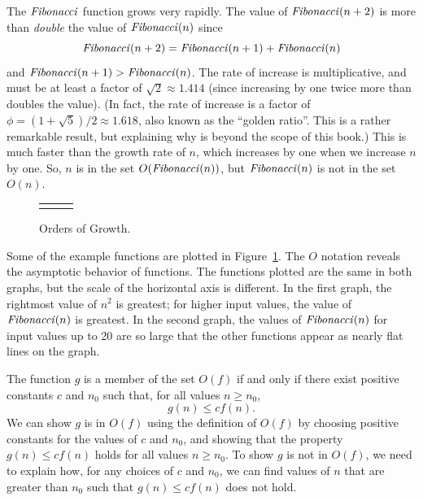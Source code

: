 \begin{schemeregion}
\begin{descriptionlist}
The $\textrm{\emph{Fibonacci}}$ function grows very rapidly.  The value of $\textrm{\emph{Fibonacci}}(n+2)$ is more than \emph{double} the value of $\textrm{\emph{Fibonacci}}(n)$ since
\begin{displaymath}
\textrm{\emph{Fibonacci}}(n+2) = \textrm{\emph{Fibonacci}}(n + 1) + \textrm{\emph{Fibonacci}}(n)
\end{displaymath}
and $\textrm{\emph{Fibonacci}}(n + 1) > \textrm{\emph{Fibonacci}}(n)$.  The rate of increase is multiplicative, and must be at least a factor of $\sqrt{2} \approx 1.414$ (since increasing by one twice more than doubles the value).  (In fact, the rate of increase is a factor of $\phi = (1 + \sqrt{5}) / 2 \approx 1.618$, also known as the ``golden ratio''.  This is a rather remarkable result, but explaining why is beyond the scope of this book.)
This is much faster than the growth rate of $n$, which increases by one when we increase $n$ by one.  So, $n$ is in the set $O(\textrm{\emph{Fibonacci}}(n))$, but $\textrm{\emph{Fibonacci}}(n)$ is not in the set $O(n)$.
\end{descriptionlist}

\begin{figure}[b]
\vspace*{2.0ex} 
\begin{tabular*}{8.0in}{p{2.5in}p{2.5in}p{2in}}
 &
 & \\
\end{tabular*}
\caption{Orders of Growth.}\label{fig:growth}
\end{figure}

Some of the example functions are plotted in Figure~\ref{fig:growth}.  The $O$ notation reveals the asymptotic behavior of functions.  The functions plotted are the same in both graphs, but the scale of the horizontal axis is different.  In the first graph, the rightmost value of $n^2$ is greatest; for higher input values, the value of $\textrm{\emph{Fibonacci}}(n)$ is greatest.  In the second graph, the values of $\textrm{\emph{Fibonacci}}(n)$ for input values up to 20 are so large that the other functions appear as nearly flat lines on the graph.

 The function $g$ is a member of the set $O(f)$ if and only if there exist positive constants $c$ and $n_0$ such that, for all values $n \ge n_0$,
\begin{displaymath}
g(n) \le cf(n).
\end{displaymath}
We can show $g$ is in $O(f)$ using the definition of $O(f)$ by choosing positive constants for the values of $c$ and $n_0$, and showing that the property $g(n) \le cf(n)$ holds for all values $n \ge n_0$.  To show $g$ is not in $O(f)$, we need to explain how, for any choices of $c$ and $n_0$, we can find values of $n$ that are greater than $n_0$ such that $g(n) \le cf(n)$ does not hold.


\end{schemeregion}
